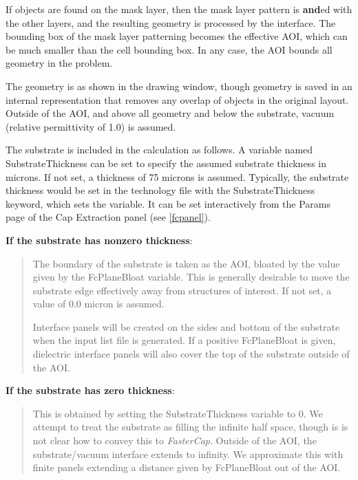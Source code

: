 If objects are found on the mask layer, then the mask layer pattern is
{\bf and}ed with the other layers, and the resulting geometry is
processed by the interface.  The bounding box of the mask layer
patterning becomes the effective AOI, which can be much smaller than
the cell bounding box.  In any case, the AOI bounds all geometry in
the problem.

The geometry is as shown in the drawing window, though geometry is
saved in an internal representation that removes any overlap of
objects in the original layout.  Outside of the AOI, and above all
geometry and below the substrate, vacuum (relative permittivity of
1.0) is assumed.

The substrate is included in the calculation as follows.  A variable
named {\et SubstrateThickness} can be set to specify the assumed
substrate thickness in microns.  If not set, a thickness of 75 microns
is assumed.  Typically, the substrate thickness would be set in the
technology file with the {\vt SubstrateThickness} keyword, which sets
the variable.  It can be set interactively from the {\cb Params} page
of the {\cb Cap Extraction} panel (see \ref{fcpanel}).

{\bf If the substrate has nonzero thickness}:

\begin{quote}
The boundary of the substrate is taken as the AOI, bloated by the
value given by the {\et FcPlaneBloat} variable.  This is generally
desirable to move the substrate edge effectively away from structures
of interest.  If not set, a value of 0.0 micron is assumed.

Interface panels will be created on the sides and bottom of the
substrate when the input list file is generated.  If a positive {\et
FcPlaneBloat} is given, dielectric interface panels will also cover
the top of the substrate outside of the AOI.
\end{quote}

{\bf If the substrate has zero thickness}:

\begin{quote}
This is obtained by setting the {\et SubstrateThickness} variable to
0.  We attempt to treat the substrate as filling the infinite half
space, though is is not clear how to convey this to {\it FasterCap\/}. 
Outside of the AOI, the substrate/vacuum interface extends to
infinity.  We approximate this with finite panels extending a distance
given by {\et FcPlaneBloat} out of the AOI.
\end{quote}

